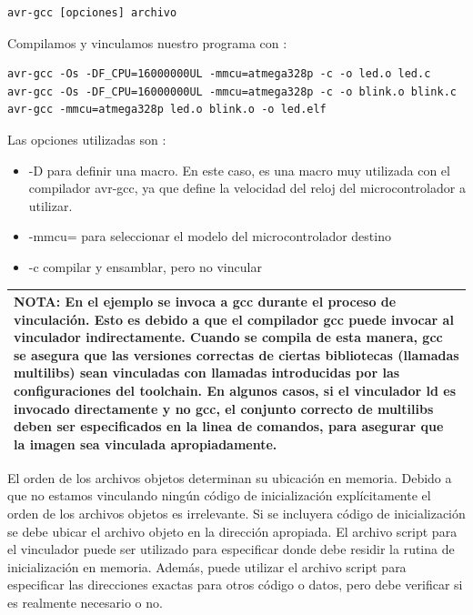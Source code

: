 \documentclass[output=paper, 
colorlinks,
citecolor=brown,
newtxmath
]{langscibook}
\begin{document}
\begin{verbatim}
avr-gcc [opciones] archivo
\end{verbatim}

Compilamos y vinculamos nuestro programa con :

\begin{verbatim}
avr-gcc -Os -DF_CPU=16000000UL -mmcu=atmega328p -c -o led.o led.c
avr-gcc -Os -DF_CPU=16000000UL -mmcu=atmega328p -c -o blink.o blink.c
avr-gcc -mmcu=atmega328p led.o blink.o -o led.elf
\end{verbatim}

Las opciones utilizadas son :

\begin{itemize}
\item -D para definir una macro. En este caso, es una macro muy utilizada
con el compilador avr-gcc, ya que define la velocidad del reloj del microcontrolador
a utilizar.
\item -mmcu= para seleccionar el modelo del microcontrolador destino 
\item -c compilar y ensamblar, pero no vincular
\end{itemize}


\begin{center}
\begin{tabularx}{\textwidth}{|X|}
\hline
\rowcolor{lightgray}
\textbf{NOTA: En el ejemplo se invoca  a gcc durante el proceso de vinculación.
Esto es debido a que el compilador gcc puede invocar al vinculador indirectamente.
Cuando se compila de esta manera, gcc se asegura que las versiones correctas
de ciertas bibliotecas (llamadas multilibs) sean vinculadas con llamadas
introducidas por las configuraciones del toolchain. En algunos casos, si el vinculador ld es invocado directamente y no gcc, el conjunto correcto de multilibs deben
ser especificados en la linea de comandos, para asegurar que la imagen sea
vinculada apropiadamente.}\\
\hline
\end{tabularx}
\end{center}


El orden de los archivos objetos determinan su ubicación en memoria.
Debido a que no estamos vinculando ningún código de inicialización explícitamente
el orden de los archivos objetos es irrelevante.
Si se incluyera código de inicialización se debe ubicar el archivo objeto 
en la dirección apropiada. El archivo script para el vinculador puede ser 
utilizado para especificar donde debe residir la rutina de inicialización
en memoria. Además, puede utilizar el archivo script para 
especificar las direcciones exactas para otros código o datos, pero debe
verificar si es realmente necesario o no.
\end{document}
